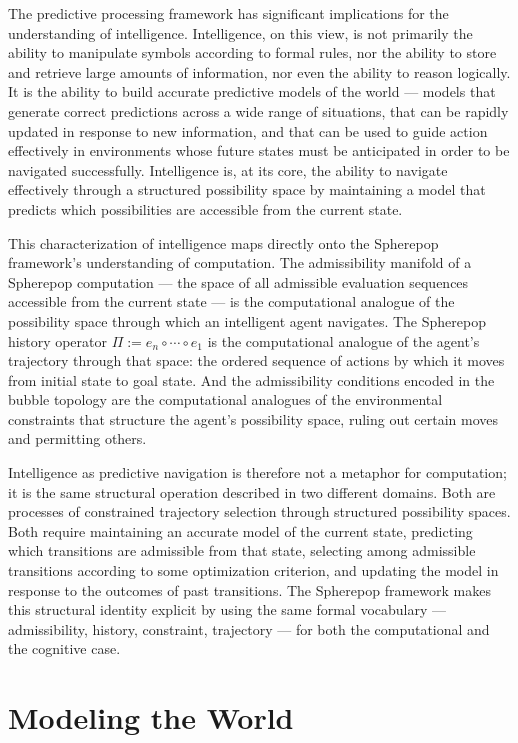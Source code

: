 \documentclass[12pt,openany]{book}
\theoremstyle{plain}
\theoremstyle{definition}
\theoremstyle{remark}
\begin{document}
The predictive processing framework has significant implications for the understanding of intelligence. Intelligence, on this view, is not primarily the ability to manipulate symbols according to formal rules, nor the ability to store and retrieve large amounts of information, nor even the ability to reason logically. It is the ability to build accurate predictive models of the world — models that generate correct predictions across a wide range of situations, that can be rapidly updated in response to new information, and that can be used to guide action effectively in environments whose future states must be anticipated in order to be navigated successfully. Intelligence is, at its core, the ability to navigate effectively through a structured possibility space by maintaining a model that predicts which possibilities are accessible from the current state.

This characterization of intelligence maps directly onto the Spherepop framework's understanding of computation. The admissibility manifold of a Spherepop computation — the space of all admissible evaluation sequences accessible from the current state — is the computational analogue of the possibility space through which an intelligent agent navigates. The Spherepop history operator $\Pi := e_n \circ \cdots \circ e_1$ is the computational analogue of the agent's trajectory through that space: the ordered sequence of actions by which it moves from initial state to goal state. And the admissibility conditions encoded in the bubble topology are the computational analogues of the environmental constraints that structure the agent's possibility space, ruling out certain moves and permitting others.

Intelligence as predictive navigation is therefore not a metaphor for computation; it is the same structural operation described in two different domains. Both are processes of constrained trajectory selection through structured possibility spaces. Both require maintaining an accurate model of the current state, predicting which transitions are admissible from that state, selecting among admissible transitions according to some optimization criterion, and updating the model in response to the outcomes of past transitions. The Spherepop framework makes this structural identity explicit by using the same formal vocabulary — admissibility, history, constraint, trajectory — for both the computational and the cognitive case.

\section{Modeling the World}
\end{document}
